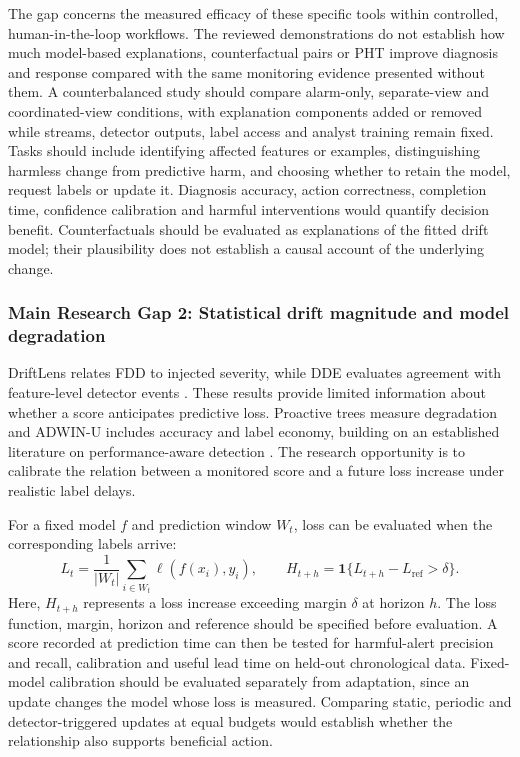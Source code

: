 \documentclass[10pt,a4paper]{article}
\begin{document}
The gap concerns the measured efficacy of these specific tools within controlled, human-in-the-loop workflows. The reviewed demonstrations do not establish how much model-based explanations, counterfactual pairs or PHT improve diagnosis and response compared with the same monitoring evidence presented without them. A counterbalanced study should compare alarm-only, separate-view and coordinated-view conditions, with explanation components added or removed while streams, detector outputs, label access and analyst training remain fixed. Tasks should include identifying affected features or examples, distinguishing harmless change from predictive harm, and choosing whether to retain the model, request labels or update it. Diagnosis accuracy, action correctness, completion time, confidence calibration and harmful interventions would quantify decision benefit. Counterfactuals should be evaluated as explanations of the fitted drift model; their plausibility does not establish a causal account of the underlying change.

\subsubsection*{Main Research Gap 2: Statistical drift magnitude and model degradation}
DriftLens relates FDD to injected severity, while DDE evaluates agreement with feature-level detector events \cite{greco,szucs}. These results provide limited information about whether a score anticipates predictive loss. Proactive trees measure degradation and ADWIN-U includes accuracy and label economy, building on an established literature on performance-aware detection \cite{guerrero,assis,bayram,lukats}. The research opportunity is to calibrate the relation between a monitored score and a future loss increase under realistic label delays.

For a fixed model $f$ and prediction window $W_t$, loss can be evaluated when the corresponding labels arrive:
\[
 L_t=\frac{1}{|W_t|}\sum_{i\in W_t}\ell(f(x_i),y_i),
 \qquad H_{t+h}=\mathbf{1}\{L_{t+h}-L_{\mathrm{ref}}>\delta\}.
\]
Here, $H_{t+h}$ represents a loss increase exceeding margin $\delta$ at horizon $h$. The loss function, margin, horizon and reference should be specified before evaluation. A score recorded at prediction time can then be tested for harmful-alert precision and recall, calibration and useful lead time on held-out chronological data. Fixed-model calibration should be evaluated separately from adaptation, since an update changes the model whose loss is measured. Comparing static, periodic and detector-triggered updates at equal budgets would establish whether the relationship also supports beneficial action.
\end{document}
